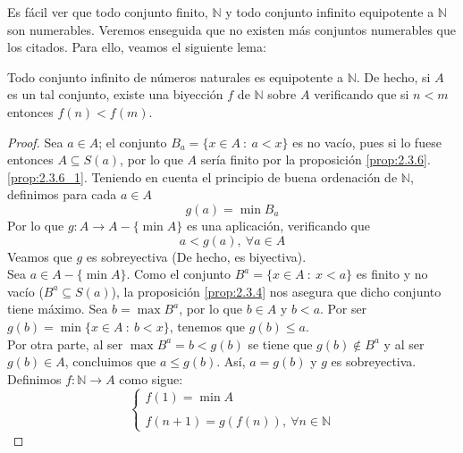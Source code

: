 Es fácil ver que todo conjunto finito, $\mathbb{N}$ y todo conjunto infinito equipotente a $\mathbb{N}$ son numerables. Veremos enseguida que no existen más conjuntos numerables que los citados. Para ello, veamos el siguiente lema:
\begin{lema}\label{lema:2.4.2}
    Todo conjunto infinito de números naturales es equipotente a $\mathbb{N}$. De hecho, si $A$ es un tal  conjunto, existe una biyección $f$ de $\mathbb{N}$ sobre $A$ verificando que si $n < m$ entonces $f(n) < f(m)$.
\end{lema}
\begin{proof}
    Sea $a \in A$; el conjunto $B_a=\{x \in A~:~ a < x\}$ es no vacío, pues si lo fuese entonces $A \subseteq S(a)$, por lo que $A$ sería finito por la proposición \ref{prop:2.3.6}.\ref{prop:2.3.6_1}. Teniendo en cuenta el principio de buena ordenación de $\mathbb{N}$, definimos para cada $a \in A$
    \begin{equation*}
        g(a)=\min B_a
    \end{equation*}
    Por lo que $g:A\longrightarrow A-\{\min A\}$ es una aplicación, verificando que
    \begin{equation*}
        a < g(a), ~\forall a \in A
    \end{equation*}
    Veamos que $g$ es sobreyectiva (De hecho, es biyectiva).\\
    
    Sea $a \in A-\{\min A\}$. Como el conjunto $B^a=\{x \in A~:~ x< a\}$ es finito y no vacío ($B^a \subseteq S(a)$), la proposición \ref{prop:2.3.4} nos asegura que dicho conjunto tiene máximo. Sea $b = \max B^a$, por lo que $b \in A$ y $b < a$. Por ser $g(b)=\min\{x \in A~:~ b < x\}$, tenemos que $g(b) \leq a$.\\
    
    Por otra parte, al ser $\max B^a = b < g(b)$ se tiene que $g(b) \notin B^a$ y al ser $g(b) \in A$, concluimos que $a \leq g(b)$. Así, $a = g(b)$ y $g$ es sobreyectiva.\\
    
    Definimos $f:\mathbb{N} \longrightarrow A$ como sigue:
    \begin{equation*}
        \left\{ \begin{array}{lcc}
            f(1)=\min A \\ \\
            f(n+1)=g(f(n)),~\forall n \in \mathbb{N}
            \end{array}
        \right.
    \end{equation*}
    

\end{proof}
